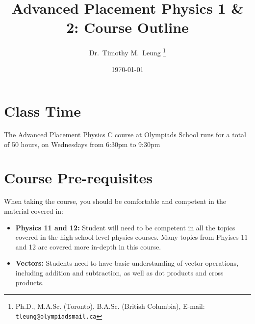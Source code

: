 \documentclass{../../oss-handout}
\title{Advanced Placement Physics 1 \& 2: Course Outline}
\author{Dr.\ Timothy M.\ Leung
  \footnote{Ph.D., M.A.Sc. (Toronto), B.A.Sc. (British Columbia), E-mail:
    \texttt{tleung@olympiadsmail.ca}}
}
\date{\today}
\begin{document}
\thispagestyle{title}
\gentitle

\section*{Class Time}
The Advanced Placement Physics C course at Olympiads School runs for a total of
50 hours, on%
Wednesdays from 6:30pm to 9:30pm

\section*{Course Pre-requisites}
When taking the course, you should be comfortable and competent in the material
covered in:
\begin{itemize}[nosep]
\item\textbf{Physics 11 and 12:} Student will need to be competent in all the
  topics covered in the high-school level physics courses. Many topics from
  Phyiscs 11 and 12 are covered more in-depth in this course.
\item\textbf{Vectors:} Students need to have basic understanding of vector
  operations, including addition and subtraction, as well as dot products and
  cross products.
\end{itemize}
\end{document}
